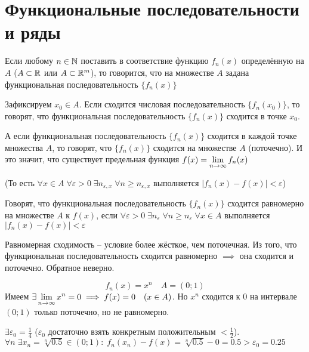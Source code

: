 \section{Функциональные последовательности и ряды}

\begin{definition}
    Если любому $n \in \mathbb{N}$ поставить в соответствие функцию $f_n(x)$
    определённую на $A$ ($A \subset \mathbb{R}$ или $A \subset \mathbb{R}^m$), то говорится,
    что на множестве $A$ задана функциональная последовательность $\{ f_n(x) \}$
\end{definition}

\begin{definition}
    Зафиксируем $x_0 \in A$. Если сходится числовая последовательность
    $\{ f_n(x_0) \}$, то говорят, что функциональная последовательность
    $\{ f_n(x) \}$ сходится в точке $x_0$.

    А если функциональная последовательность $\{ f_n(x) \}$ сходится в
    каждой точке множества $A$, то говорят, что $\{ f_n(x) \}$ сходится на
    множестве $A$ (поточечно). И это значит, что существует предельная
    функция $f(x) = \displaystyle\lim_{n \to \infty} f_n(x)$

    (То есть $\forall x \in A \; \forall \varepsilon > 0 \; 
    \exists n_{\varepsilon,x} \; \forall n \geq n_{\varepsilon,x}$
    выполняется $|f_n(x) - f(x)| < \varepsilon$)
\end{definition}

\begin{definition}
    Говорят, что функциональная последовательность $\{ f_n(x) \}$ сходится
    равномерно на множестве $A$ к $f(x)$, если
    $\forall \varepsilon > 0 \; \exists n_\varepsilon \;
    \forall n \geq n_\varepsilon \; \forall x \in A$ выполняется
    $|f_n(x) - f(x)| < \varepsilon$
\end{definition}

\begin{example}
    Равномерная сходимость -- условие более жёсткое, чем поточечная. Из того,
    что функциональная последовательность сходится равномерно $\implies$
    она сходится и поточечно. Обратное неверно.

    \[ f_n(x) = x^n \quad A = (0; 1) \]
    Имеем $\exists \displaystyle\lim_{n \to \infty} x^n = 0 \implies f(x) = 0 \quad (x \in A)$.
    Но $x^n$ сходится к 0 на интервале $(0; 1)$ только поточечно, но не
    равномерно.

    $\exists \varepsilon_0 = \frac{1}{4}$ ($\varepsilon_0$ достаточно взять
    конкретным положительным $< \frac{1}{2}$).
    $\forall n \; \exists x_n = \sqrt[n]{0.5} \in (0; 1): \; f_n(x_n) - f(x) =
    \sqrt[n]{0.5} - 0 = 0.5 > \varepsilon_0 = 0.25$
\end{example}

